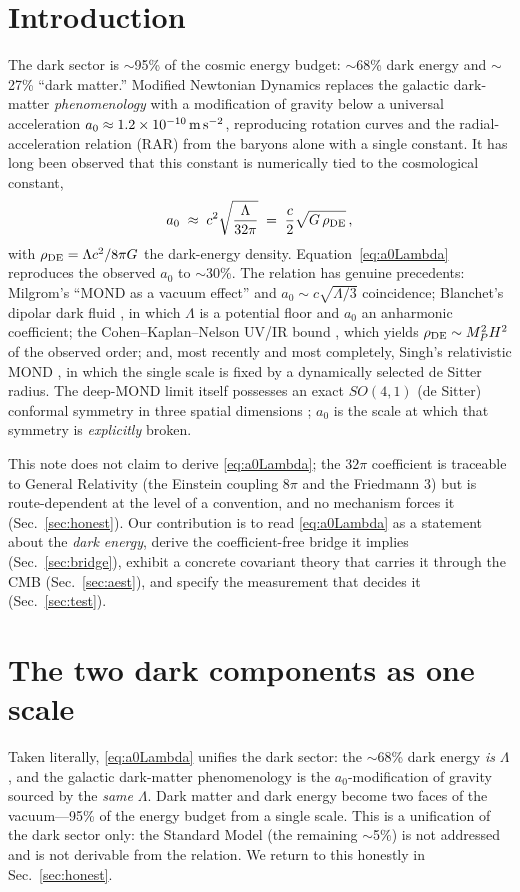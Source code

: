 \documentclass[11pt]{article}
\newcommand{\az}{a_0}
\newcommand{\rde}{\rho_{\rm DE}}
\begin{document}
\section{Introduction}
The dark sector is $\sim$95\% of the cosmic energy budget: $\sim$68\% dark energy and $\sim$27\% ``dark matter.''
Modified Newtonian Dynamics \cite{Milgrom1983,BekensteinMilgrom1984} replaces the galactic dark-matter
\emph{phenomenology} with a modification of gravity below a universal acceleration $\az\approx1.2\times10^{-10}\,
{\rm m\,s^{-2}}$, reproducing rotation curves and the radial-acceleration relation (RAR) \cite{McGaugh2016} from
the baryons alone with a single constant. It has long been observed \cite{Milgrom1999,Milgrom2009} that this
constant is numerically tied to the cosmological constant,
\begin{equation}
\az \;\approx\; c^2\sqrt{\frac{\Lambda}{32\pi}}\;=\;\frac{c}{2}\sqrt{G\,\rde}\,,
\label{eq:a0Lambda}
\end{equation}
with $\rde=\Lambda c^2/8\pi G$ the dark-energy density. Equation~\eqref{eq:a0Lambda} reproduces the observed $\az$
to $\sim$30\%. The relation has genuine precedents: Milgrom's ``MOND as a vacuum effect'' \cite{Milgrom1999} and
$\az\sim c\sqrt{\Lambda/3}$ coincidence; Blanchet's dipolar dark fluid \cite{Blanchet2009}, in which $\Lambda$ is a
potential floor and $\az$ an anharmonic coefficient; the Cohen--Kaplan--Nelson UV/IR bound \cite{CKN1999}, which
yields $\rde\sim M_P^2 H^2$ of the observed order; and, most recently and most completely, Singh's relativistic
MOND \cite{Singh2026}, in which the single scale is fixed by a dynamically selected de Sitter radius. The deep-MOND
limit itself possesses an exact $SO(4,1)$ (de Sitter) conformal symmetry in three spatial dimensions
\cite{Milgrom2009}; $\az$ is the scale at which that symmetry is \emph{explicitly} broken.

This note does not claim to derive \eqref{eq:a0Lambda}; the $32\pi$ coefficient is traceable to General Relativity
(the Einstein coupling $8\pi$ and the Friedmann $3$) but is route-dependent at the level of a convention, and no
mechanism forces it (Sec.~\ref{sec:honest}). Our contribution is to read \eqref{eq:a0Lambda} as a statement about
the \emph{dark energy}, derive the coefficient-free bridge it implies (Sec.~\ref{sec:bridge}), exhibit a concrete
covariant theory that carries it through the CMB (Sec.~\ref{sec:aest}), and specify the measurement that decides it
(Sec.~\ref{sec:test}).

\section{The two dark components as one scale}
Taken literally, \eqref{eq:a0Lambda} unifies the dark sector: the $\sim$68\% dark energy \emph{is} $\Lambda$, and
the galactic dark-matter phenomenology is the $\az$-modification of gravity sourced by the \emph{same} $\Lambda$.
Dark matter and dark energy become two faces of the vacuum---95\% of the energy budget from a single scale. This is
a unification of the dark sector only: the Standard Model (the remaining $\sim$5\%) is not addressed and is not
derivable from the relation. We return to this honestly in Sec.~\ref{sec:honest}.
\end{document}
